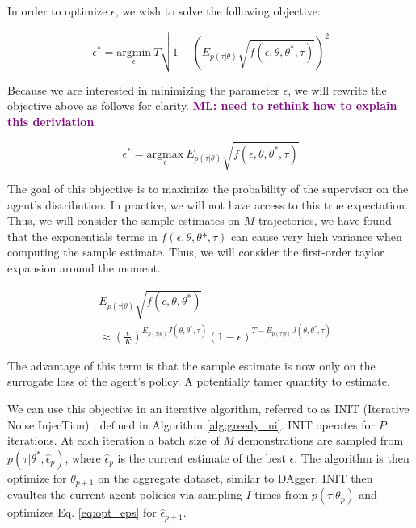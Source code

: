 \documentclass[conference]{article}
\newcommand{\mlnote}[1]{\ifthenelse{ \boolean{include-notes}}%
 {\textcolor{purple}{\textbf{ML: #1}}}{}}
\begin{document}
In order to optimize $\epsilon$, we wish to solve the following objective: 

$$\epsilon^* = \underset{\epsilon}{\mbox{argmin}} \: T\sqrt{1 -\left( E_{p(\tau|\theta)}\sqrt{f(\epsilon,\theta,\theta^*,\tau)}\right)^2} $$

Because we are interested in minimizing the parameter $\epsilon$, we will rewrite the objective above as follows for clarity. \mlnote{need to rethink how to explain this deriviation}

$$\epsilon^* = \underset{\epsilon}{\mbox{argmax}} \: E_{p(\tau|\theta)}\sqrt{f(\epsilon,\theta,\theta^*,\tau)}$$


The goal of this objective is to maximize the probability of the supervisor on the agent's distribution. In practice, we will not have access to this true expectation. Thus, we will consider the sample estimates on $M$ trajectories, we have found that the exponentials terms in $f(\epsilon,\theta,\theta*,\tau)$ can cause very high variance when computing the sample estimate. Thus, we will consider the first-order taylor expansion around the moment. 

\begin{align}
&E_{p(\tau|\theta)}\sqrt{f(\epsilon,\theta,\theta^*)} \\
&\approx (\frac{\epsilon}{K})^{E_{p(\tau|\theta)}J(\theta,\theta^*,\tau)}(1-\epsilon)^{T-E_{p(\tau|\theta)}J(\theta,\theta^*,\tau)}
\end{align}

The advantage of this term is that the sample estimate is now only on the surrogate loss of the agent's policy. A potentially tamer quantity to estimate. 

We can use this objective in an iterative algorithm, referred to as INIT (Iterative Noise InjecTion) , defined in Algorithm \ref{alg:greedy_ni}. INIT operates for $P$ iterations. At each iteration a batch size of $M$ demonstrations are sampled from $p(\tau|\theta^*,\hat{\epsilon}_{p})$, where $\hat{\epsilon}_{p}$ is the current estimate of the best $\epsilon$. The algorithm is then optimize for $\theta_{p+1}$ on the aggregate dataset, similar to DAgger. INIT then evaultes the current agent policies via sampling $I$ times from $p(\tau|\theta_p)$ and optimizes Eq. \ref{eq:opt_eps} for $\hat{\epsilon}_{p+1}$. 
\end{document}
